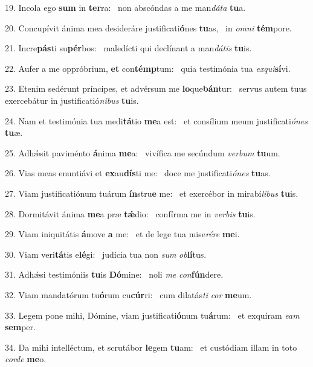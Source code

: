 19. Incola ego \textbf{sum} in \textbf{ter}ra: \ast\  non abscóndas a me man\textit{dá}\textit{ta} \textbf{tu}a.\

20. Concupívit ánima mea desideráre justificati\textbf{ó}nes \textbf{tu}as, \ast\  in \textit{om}\textit{ni} \textbf{tém}pore.\

21. Incre\textbf{pás}ti su\textbf{pér}bos: \ast\  maledícti qui declínant a man\textit{dá}\textit{tis} \textbf{tu}is.\

22. Aufer a me oppróbrium, \textbf{et} con\textbf{témp}tum: \ast\  quia testimónia tua \textit{ex}\textit{qui}\textbf{sí}vi.\

23. Etenim sedérunt príncipes, et advérsum me \textbf{lo}que\textbf{bán}tur: \ast\  servus autem tuus exercebátur in justificatió\textit{ni}\textit{bus} \textbf{tu}is.\

24. Nam et testimónia tua medi\textbf{tá}tio \textbf{me}a est: \ast\  et consílium meum justificati\textit{ó}\textit{nes} \textbf{tu}æ.\

25. Adhǽsit paviménto \textbf{á}nima \textbf{me}a: \ast\  vivífica me secúndum \textit{ver}\textit{bum} \textbf{tu}um.\

26. Vias meas enuntiávi et \textbf{ex}au\textbf{dís}ti me: \ast\  doce me justificati\textit{ó}\textit{nes} \textbf{tu}as.\

27. Viam justificatiónum tuárum \textbf{ín}stru\textbf{e} me: \ast\  et exercébor in mirabí\textit{li}\textit{bus} \textbf{tu}is.\

28. Dormitávit ánima \textbf{me}a præ \textbf{tǽ}dio: \ast\  confírma me in \textit{ver}\textit{bis} \textbf{tu}is.\

29. Viam iniquitátis \textbf{á}move \textbf{a} me: \ast\  et de lege tua mise\textit{ré}\textit{re} \textbf{me}i.\

30. Viam veri\textbf{tá}tis e\textbf{lé}gi: \ast\  judícia tua non \textit{sum} \textit{ob}\textbf{lí}tus.\

31. Adhǽsi testimóniis \textbf{tu}is \textbf{Dó}mine: \ast\  noli \textit{me} \textit{con}\textbf{fún}dere.\

32. Viam mandatórum tu\textbf{ó}rum cu\textbf{cúr}ri: \ast\  cum dilatás\textit{ti} \textit{cor} \textbf{me}um.\

33. Legem pone mihi, Dómine, viam justificati\textbf{ó}num tu\textbf{á}rum: \ast\  et exquíram \textit{e}\textit{am} \textbf{sem}per.\

34. Da mihi intelléctum, et scrutábor \textbf{le}gem \textbf{tu}am: \ast\  et custódiam illam in toto \textit{cor}\textit{de} \textbf{me}o.\


